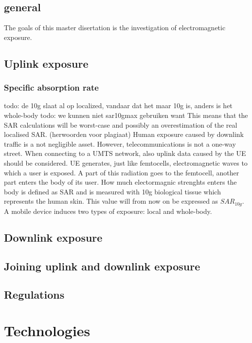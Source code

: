 \subsection{general} %
\label{sub:general}
The goals of this master disertation is the investigation of electromagnetic exposure. 

\subsection{Uplink exposure} %
\label{sub:Uplink exposure}

\subsubsection{Specific absorption rate}

todo: de 10g slaat al op localized, vandaar dat het maar 10g is, anders is het whole-body
todo: we kunnen niet sar10gmax gebruiken want This means that the SAR calculations will be worst-case and possibly an overestimation of the real localised SAR. (herwoorden voor plagiaat)
Human exposure caused by downlink traffic is a not negligible asset. However, telecommunications is not a one-way street. When connecting to a UMTS network, also uplink data caused by the \gls{UE} should be considered.
\gls{UE} generates, just like femtocells, electromagnetic waves to which a user is exposed. A part of this radiation goes to the femtocell, another part enters the body of its user. How much electormagnic strenghts enters the body is defined as \gls{SAR} and is measured with 10g biological tissue which represents the human skin. This value will from now on be expressed as $SAR_{10g}$. 
A mobile device induces two types of exposure: local and whole-body. 


\subsection{Downlink exposure} %
\label{sub:Downlink exposure}


\subsection{Joining uplink and downlink exposure} %
\label{ssub:Joining uplink and downlink exposure}


\subsection{Regulations} %
\label{ssub:Regulations}

\section{Technologies}

